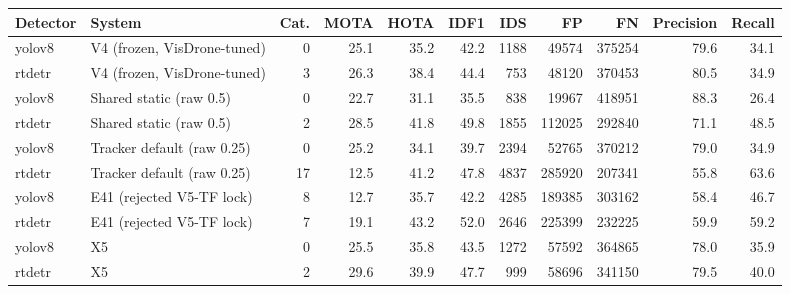 \begin{tabular}{llrrrrrrrrr}
\toprule
Detector & System & Cat. & MOTA & HOTA & IDF1 & IDS & FP & FN & Precision & Recall \\
\midrule
yolov8 & V4 (frozen, VisDrone-tuned) & 0 & 25.1 & 35.2 & 42.2 & 1188 & 49574 & 375254 & 79.6 & 34.1 \\
rtdetr & V4 (frozen, VisDrone-tuned) & 3 & 26.3 & 38.4 & 44.4 & 753 & 48120 & 370453 & 80.5 & 34.9 \\
yolov8 & Shared static (raw 0.5) & 0 & 22.7 & 31.1 & 35.5 & 838 & 19967 & 418951 & 88.3 & 26.4 \\
rtdetr & Shared static (raw 0.5) & 2 & 28.5 & 41.8 & 49.8 & 1855 & 112025 & 292840 & 71.1 & 48.5 \\
yolov8 & Tracker default (raw 0.25) & 0 & 25.2 & 34.1 & 39.7 & 2394 & 52765 & 370212 & 79.0 & 34.9 \\
rtdetr & Tracker default (raw 0.25) & 17 & 12.5 & 41.2 & 47.8 & 4837 & 285920 & 207341 & 55.8 & 63.6 \\
yolov8 & E41 (rejected V5-TF lock) & 8 & 12.7 & 35.7 & 42.2 & 4285 & 189385 & 303162 & 58.4 & 46.7 \\
rtdetr & E41 (rejected V5-TF lock) & 7 & 19.1 & 43.2 & 52.0 & 2646 & 225399 & 232225 & 59.9 & 59.2 \\
yolov8 & X5 & 0 & 25.5 & 35.8 & 43.5 & 1272 & 57592 & 364865 & 78.0 & 35.9 \\
rtdetr & X5 & 2 & 29.6 & 39.9 & 47.7 & 999 & 58696 & 341150 & 79.5 & 40.0 \\
\bottomrule
\end{tabular}
